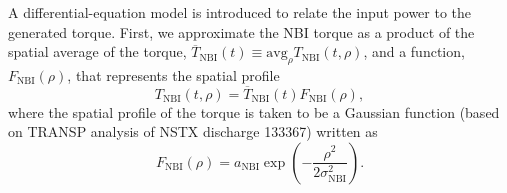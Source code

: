 \documentclass{iopart}
\begin{document}
A differential-equation model is introduced to relate the input power to the generated torque.  First, we approximate the NBI torque as a product of the spatial average of the torque, $\overline{T}_\text{NBI}(t) \equiv \text{avg}_\rho T_\text{NBI}(t,\rho)$, and a function, $F_\text{NBI}(\rho)$, that represents the spatial profile
\begin{equation}
   T_\text{NBI}(t,\rho) = \overline{T}_\text{NBI}(t) F_\text{NBI}(\rho),
\label{eq5}
\end{equation}
where the spatial profile of the torque is taken to be a Gaussian function (based on TRANSP analysis of NSTX discharge 133367) written as
\begin{equation}
F_\text{NBI}(\rho) = a_\text{NBI} \exp\left( - \frac{\rho^2}{2\sigma^2_\text{NBI}}\right).
\label{eq6}
\end{equation}
%
\end{document}
